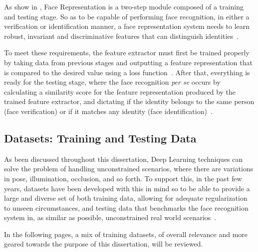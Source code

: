 \documentclass[class=report, crop=false, a4paper, 12pt]{standalone}
\begin{document}
\par As show in , Face Representation is a two-step module composed of a training and testing stage. So as to be capable of performing face recognition, in either a verification or identification manner, a face representation system needs to learn robust, invariant and discriminative features that can distinguish identities~\autocite{ranjanDeepLearningUnderstanding2018}. 
\par To meet these requirements, the feature extractor must first be trained properly by taking data from previous stages and outputting a feature representation that is compared to the desired value using a loss function~\autocite{lecunDeepLearning2015, wangDeepFaceRecognition2021}. After that, everything is ready for the testing stage, where the face recognition \textit{per se} occurs by calculating a similarity score for the feature representation produced by the trained feature extractor, and dictating if the identity belongs to the same person (face verification) or if it matches any identity (face identification)~\autocite{ranjanDeepLearningUnderstanding2018}.



\subsection{Datasets: Training and Testing Data}
\par As been discussed throughout this dissertation, Deep Learning techniques can solve the problem of handling unconstrained scenarios, where there are variations in pose, illumination, occlusion, and so forth. To support this, in the past few years, datasets have been developed with this in mind so to be able to provide a large and diverse set of both training data, allowing for adequate regularization to unseen circumstances, and testing data that benchmarks the face recognition system in, as similar as possible, unconstrained real world scenarios~\autocite{duElementsEndtoendDeep2022}. 

\vspace{\baselineskip}
In the following pages, a mix of training datasets, of overall relevance and more geared towards the purpose of this dissertation, will be reviewed.
\end{document}
